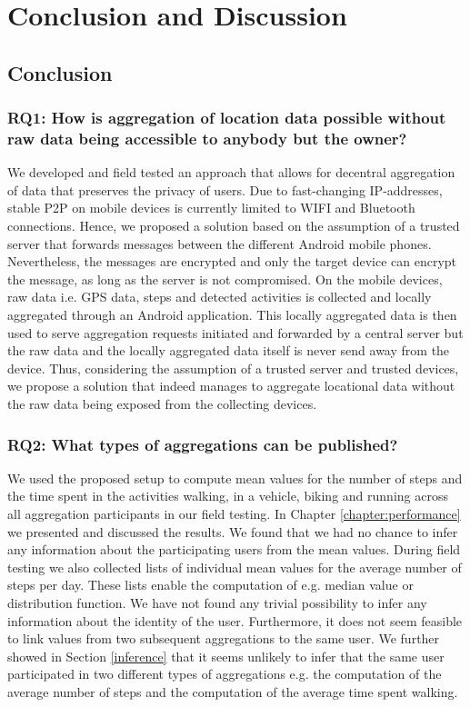 \chapter{Conclusion and Discussion}\label{chapter:conclusion}
\section{Conclusion}

\subsection*{RQ1: How is aggregation of location data possible without raw data being accessible to anybody but the owner?}
We developed and field tested an approach that allows for decentral aggregation of data that preserves the privacy of users. Due to fast-changing IP-addresses, stable P2P on mobile devices is currently limited to WIFI and Bluetooth connections. Hence, we proposed a solution based on the assumption of a trusted server that forwards messages between the different Android mobile phones. Nevertheless, the messages are encrypted and only the target device can encrypt the message, as long as the server is not compromised. On the mobile devices, raw data i.e. GPS data, steps and detected activities is collected and locally aggregated through an Android application. This locally aggregated data is then used to serve aggregation requests initiated and forwarded by a central server but the raw data and the locally aggregated data itself is never send away from the device. Thus, considering the assumption of a trusted server and trusted devices, we propose a solution that indeed manages to aggregate locational data without the raw data being exposed from the collecting devices.

\subsection*{RQ2: What types of aggregations can be published?}
We used the proposed setup to compute mean values for the number of steps and the time spent in the activities walking, in a vehicle, biking and running across all aggregation participants in our field testing. In Chapter \ref{chapter:performance} we presented and discussed the results. We found that we had no chance to infer any information about the participating users from the mean values. During field testing we also collected lists of individual mean values for the average number of steps per day. These lists enable the computation of e.g. median value or distribution function. We have not found any trivial possibility to infer any information about the identity of the user. Furthermore, it does not seem feasible to link values from two subsequent aggregations to the same user. We further showed in Section \ref{inference} that it seems unlikely to infer that the same user participated in two different types of aggregations e.g. the computation of the average number of steps and the computation of the average time spent walking.

